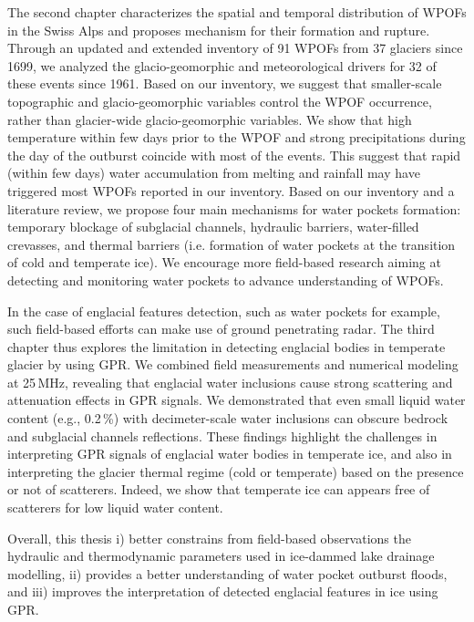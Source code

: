 The second chapter characterizes the spatial and temporal distribution of WPOFs in the Swiss Alps and proposes mechanism for their formation and rupture. Through an updated and extended inventory of 91 WPOFs from 37 glaciers since 1699, we analyzed the glacio-geomorphic and meteorological drivers for 32 of these events since 1961. Based on our inventory, we suggest that smaller-scale topographic and glacio-geomorphic variables control the WPOF occurrence, rather than glacier-wide glacio-geomorphic variables. We show that high temperature within few days prior to the WPOF and strong precipitations during the day of the outburst coincide with most of the events. This suggest that rapid (within few days) water accumulation from melting and rainfall may have triggered most WPOFs reported in our inventory. Based on our inventory and a literature review, we propose four main mechanisms for water pockets formation: temporary blockage of subglacial channels, hydraulic barriers, water-filled crevasses, and thermal barriers (i.e. formation of water pockets at the transition of cold and temperate ice). We encourage more field-based research aiming at detecting and monitoring water pockets to advance understanding of WPOFs.
%

In the case of englacial features detection, such as water pockets for example, such field-based efforts can make use of ground penetrating radar. The third chapter thus explores the limitation in detecting englacial bodies in temperate glacier by using GPR. We combined field measurements and numerical modeling at 25\,MHz, revealing that englacial water inclusions cause strong scattering and attenuation effects in GPR signals. We demonstrated that even small liquid water content (e.g., 0.2\,\%) with decimeter-scale water inclusions can obscure bedrock and subglacial channels reflections. These findings highlight the challenges in interpreting GPR signals of englacial water bodies in temperate ice, and also in interpreting the glacier thermal regime (cold or temperate) based on the presence or not of scatterers. Indeed, we show that temperate ice can appears free of scatterers for low liquid water content.
%

Overall, this thesis i) better constrains from field-based observations the hydraulic and thermodynamic parameters used in ice-dammed lake drainage modelling, ii) provides a better understanding of water pocket outburst floods, and iii) improves the interpretation of detected englacial features in ice using GPR.



